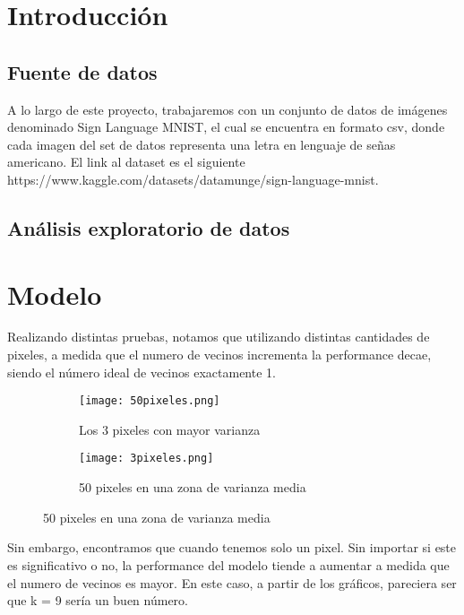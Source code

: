 \documentclass[10pt,a4paper]{article}
\begin{document}
\maketitle

\section{Introducción}

\subsection{Fuente de datos}

A lo largo de este proyecto, trabajaremos con un conjunto de datos de imágenes denominado Sign
Language MNIST, el cual se encuentra en formato csv, donde cada imagen del set de datos representa una letra en lenguaje de
señas americano. El link al dataset es el siguiente https://www.kaggle.com/datasets/datamunge/sign-language-mnist.

\subsection{Análisis exploratorio de datos}

\section{Modelo}
Realizando distintas pruebas, notamos que utilizando distintas cantidades de pixeles, a medida que el numero de vecinos incrementa
la performance decae, siendo el número ideal de vecinos exactamente 1.

\begin{figure}[ht!]
	\begin{subfigure}{0.5\textwidth}
		\texttt{[image: 50pixeles.png]} 
		\caption{Los 3 pixeles con mayor varianza}
		\label{fig:subfig1}
	\end{subfigure}
	\begin{subfigure}{0.5\textwidth}
		\texttt{[image: 3pixeles.png]}
		\caption{50 pixeles en una zona de varianza media}
		\label{fig:subfig2}
	\end{subfigure}
	\label{fig:subfigs}
\end{figure}

Sin embargo, encontramos que cuando tenemos solo un pixel. Sin importar si este es significativo o no, la performance del modelo tiende a aumentar a medida
que el numero de vecinos es mayor. En este caso, a partir de los gráficos, pareciera ser que k = 9 sería un buen número.
\end{document}
